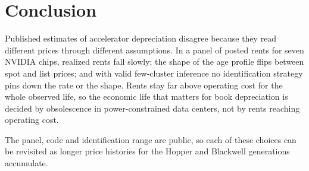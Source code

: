 \section{Conclusion}
\label{sec:conclusion}

Published estimates of accelerator depreciation disagree because they read different prices
through different assumptions. In a panel of posted rents for seven NVIDIA chips, realized
rents fall slowly; the shape of the age profile flips between spot and list prices; and with valid
few-cluster inference no identification strategy pins down the rate or the shape. Rents stay far
above operating cost for the whole observed life, so the economic life that matters for book
depreciation is decided by obsolescence in power-constrained data centers, not by rents reaching
operating cost.


The panel, code and identification range are public, so each of these choices can be revisited as
longer price histories for the Hopper and Blackwell generations accumulate.
